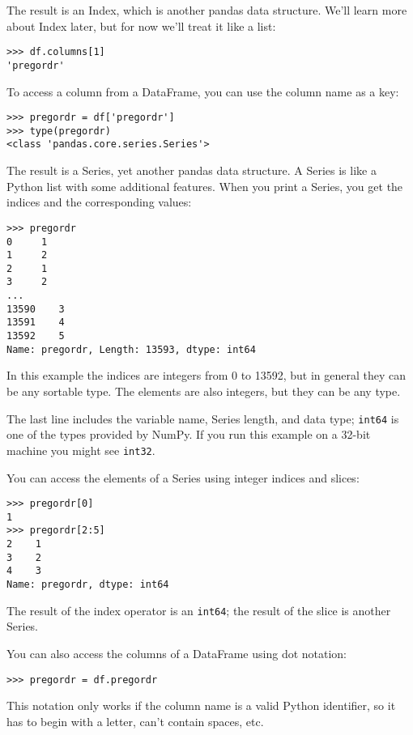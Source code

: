 The result is an Index, which is another pandas data structure.  
We'll learn more about Index later, but for
now we'll treat it like a list:

\begin{verbatim}
>>> df.columns[1]
'pregordr'
\end{verbatim}

To access a column from a DataFrame, you can use the column
name as a key:

\begin{verbatim}
>>> pregordr = df['pregordr']
>>> type(pregordr)
<class 'pandas.core.series.Series'>
\end{verbatim}

The result is a Series, yet another pandas data structure.
A Series is like a Python list with some additional features.
When you print a Series, you get the indices and the
corresponding values:

\begin{verbatim}
>>> pregordr
0     1
1     2
2     1
3     2
...
13590    3
13591    4
13592    5
Name: pregordr, Length: 13593, dtype: int64
\end{verbatim}

In this example the indices are integers from 0 to 13592, but in
general they can be any sortable type.  The elements
are also integers, but they can be any type.

The last line includes the variable name, Series length, and data type;
{\tt int64} is one of the types provided by NumPy.  If you run
this example on a 32-bit machine you might see {\tt int32}.

You can access the elements of a Series using integer indices
and slices:

\begin{verbatim}
>>> pregordr[0]
1
>>> pregordr[2:5]
2    1
3    2
4    3
Name: pregordr, dtype: int64
\end{verbatim}

The result of the index operator is an {\tt int64}; the
result of the slice is another Series.

You can also access the columns of a DataFrame using dot notation:

\begin{verbatim}
>>> pregordr = df.pregordr
\end{verbatim}

This notation only works if the column name is a valid Python
identifier, so it has to begin with a letter, can't contain spaces, etc.


